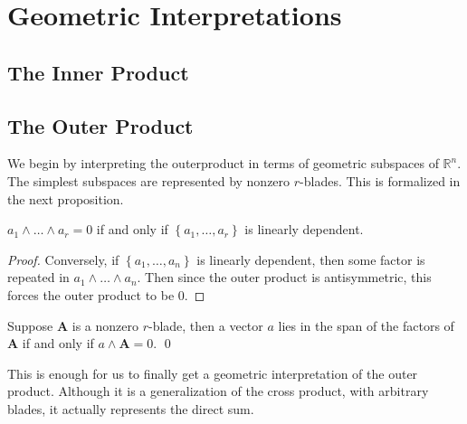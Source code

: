 \documentclass[twoside,10pt]{article}
\begin{document}


\section{Geometric Interpretations}

\subsection{The Inner Product}


\subsection{The Outer Product}

We begin by interpreting the outerproduct in terms of geometric subspaces of $\mathbb{R}^{n}$. The simplest subspaces are represented by nonzero $r$-blades. This is formalized in the next proposition.

\begin{prop}
	\label{OP-zero}
$a_1 \wedge \dots \wedge a_r = 0$ if and only if $\left\{ a_1, \dots, a_r \right\}$ is linearly dependent.
\end{prop}
\begin{proof}
	  Conversely, if $\left\{ a_1, \dots, a_n \right\}$ is linearly dependent, then some factor is repeated in $a_1 \wedge \dots \wedge a_n$. Then since the outer product is antisymmetric, this forces the outer product to be 0.
\end{proof}

\begin{cor}
	Suppose $\mathbf{A}$ is a nonzero $r$-blade, then a vector $a$ lies in the span of the factors of $\mathbf{A}$ if and only if $a \wedge \mathbf{A}=0$. \qed
\end{cor}

This is enough for us to finally get a geometric interpretation of the outer product. Although it is a generalization of the cross product, with arbitrary blades, it actually represents the direct sum.
\end{document}
